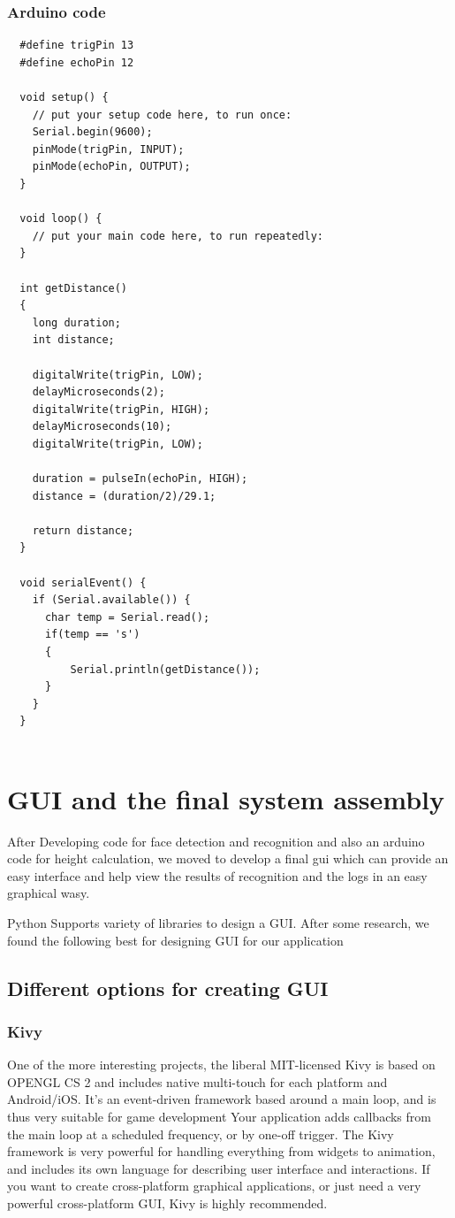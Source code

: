 \documentclass[a4paper,12pt]{article}
\begin{document}
\subsubsection*{Arduino code}
\begin{verbatim}
  #define trigPin 13
  #define echoPin 12

  void setup() {
    // put your setup code here, to run once:
    Serial.begin(9600);
    pinMode(trigPin, INPUT);
    pinMode(echoPin, OUTPUT); 
  }

  void loop() {
    // put your main code here, to run repeatedly:
  }

  int getDistance()
  {
    long duration;
    int distance;

    digitalWrite(trigPin, LOW);
    delayMicroseconds(2);
    digitalWrite(trigPin, HIGH);
    delayMicroseconds(10);
    digitalWrite(trigPin, LOW);

    duration = pulseIn(echoPin, HIGH);
    distance = (duration/2)/29.1;

    return distance;
  }

  void serialEvent() {
    if (Serial.available()) {
      char temp = Serial.read();
      if(temp == 's')
      {
          Serial.println(getDistance());
      }
    }
  }


\end{verbatim}


\newpage
\section{GUI and the final system assembly}
After Developing code for face detection and recognition and also an arduino code for height calculation, we moved to develop a 
final gui which can provide an easy interface and help view the results of recognition and the logs in an easy graphical wasy. 

Python Supports variety of libraries to design a GUI. After some research, we found the following best for 
designing GUI for our application

\subsection{Different options for creating GUI}
\subsubsection*{Kivy}
One of the more interesting projects, the liberal MIT-licensed Kivy is based on OPENGL CS 2 and includes native multi-touch for each 
platform and Android/iOS. It’s an event-driven framework based around a main loop, and is thus very suitable for game development 
Your application adds callbacks from the main loop at a scheduled frequency, or by one-off trigger. The Kivy framework is very powerful
for handling everything from widgets to animation, and includes its own language for describing user interface and interactions. 
If you want to create cross-platform graphical applications, or just need a very powerful cross-platform GUI, Kivy is highly 
recommended.
\end{document}
